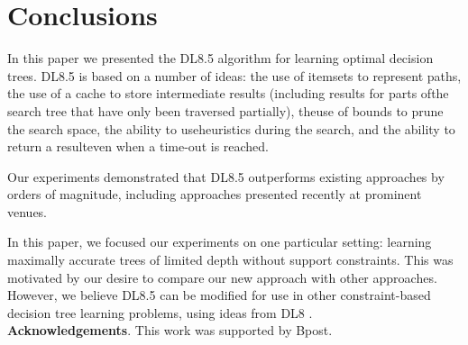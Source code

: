 \section{Conclusions}
In this paper we presented the DL8.5 algorithm for learning optimal decision trees. DL8.5 is based on a number of ideas: the use of itemsets to represent paths, the use of a cache to store intermediate results (including results for parts ofthe search tree that have only been traversed partially), theuse of bounds to prune the search space, the ability to useheuristics during the search, and the ability to return a resulteven when a time-out is reached.

Our experiments demonstrated that DL8.5 outperforms existing approaches by orders of magnitude, including approaches presented recently at prominent venues.

In this paper, we focused our experiments on one particular setting: learning maximally accurate trees of limited depth without support constraints. This was motivated by our desire to compare our new approach with other approaches. However, we believe DL8.5 can be modified for use in other constraint-based decision tree learning problems, using ideas from DL8 \cite{nijssen:2010optimal}.\\
\textbf{Acknowledgements}. This work was supported by Bpost.